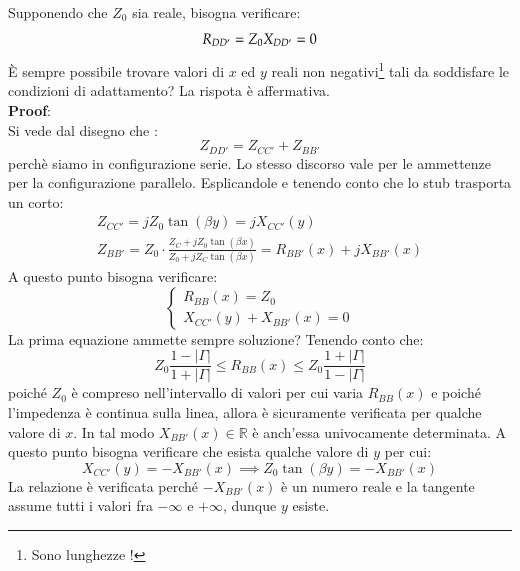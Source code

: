 \documentclass{book}
\begin{document}
        Supponendo che $Z_{0}$ sia reale, bisogna verificare:
        \begin{equation}
            R_{DD'} = Z_{0} \\
            X_{DD'} = 0
        \end{equation}
        È sempre possibile trovare valori di $x$ ed $y$ reali non negativi\footnote{Sono lunghezze !} tali da soddisfare le condizioni 
        di adattamento? La rispota è affermativa.
        \\ \textbf{Proof}: 
        \\ Si vede dal disegno che :
        \begin{equation}
            Z_{DD'} = Z_{CC'}+Z_{BB'}
        \end{equation}
        perchè siamo in configurazione serie. Lo stesso discorso vale per le ammettenze per la configurazione parallelo.
        Esplicandole e tenendo conto che lo stub trasporta un corto:
        \begin{align*}
            Z_{CC'} = jZ_{0}\tan(\beta y) = jX_{CC'}(y) \\
            Z_{BB'} = Z_{0} \cdot \frac{Z_{C}+jZ_{0}\tan(\beta x)}{Z_{0}+jZ_{C}\tan(\beta x)} = R_{BB'}(x)+jX_{BB'}(x)
        \end{align*}
        A questo punto bisogna verificare:
        \begin{equation}
            \begin{cases}
                R_{BB}(x)=Z_{0} \\
                X_{CC'}(y)+X_{BB'}(x) = 0
            \end{cases}
        \end{equation}
        La prima equazione ammette sempre soluzione? Tenendo conto che:
        \begin{equation}
            Z_{0} \frac{1-|\Gamma|}{1+|\Gamma|} \leq R_{BB}(x) \leq Z_{0}\frac{1+|\Gamma|}{1-|\Gamma|}
        \end{equation}
        poiché $Z_{0}$ è compreso nell'intervallo di valori per cui varia $R_{BB}(x)$ e poiché l'impedenza è continua sulla linea,
        allora è sicuramente verificata per qualche valore di $x$. In tal modo $X_{BB'}(x) \in \mathbb{R}$ è anch'essa univocamente determinata.
        A questo punto bisogna verificare che esista qualche valore di $y$ per cui:
        \begin{equation}
            X_{CC'}(y)=-X_{BB'}(x) \implies Z_{0}\tan(\beta y) = -X_{BB'}(x)
        \end{equation} 
        La relazione è verificata perché $-X_{BB'}(x)$ è un numero reale e la tangente assume tutti i valori fra $-\infty$ e $+\infty$, dunque $y$ esiste.
\end{document}
